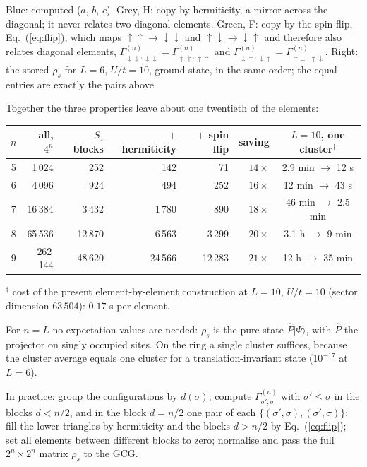 \documentclass[11pt]{article}
\newcommand{\rdm}{\Gamma^{(n)}}
\begin{document}
{\small Blue: computed ($a$, $b$, $c$). Grey, H: copy by hermiticity, a mirror across the diagonal;
it never relates two diagonal elements. Green, F: copy by the spin flip, Eq.~(\ref{eq:flip}), which maps
$\uparrow\uparrow\to\downarrow\downarrow$ and $\uparrow\downarrow\to\downarrow\uparrow$ and therefore also relates diagonal elements,
$\rdm_{\downarrow\downarrow,\downarrow\downarrow}=\rdm_{\uparrow\uparrow,\uparrow\uparrow}$ and
$\rdm_{\downarrow\uparrow,\downarrow\uparrow}=\rdm_{\uparrow\downarrow,\uparrow\downarrow}$. Right: the stored $\rho_s$ for
$L=6$, $U/t=10$, ground state, in the same order; the equal entries are exactly the pairs above.}

Together the three properties leave about one twentieth of the elements:

\begin{table}[H]
\centering
\begin{tabular}{c r r r r r c}
\toprule
$n$ & all, $4^n$ & $S_z$ blocks & $+$ hermiticity & $+$ spin flip & saving & $L=10$, one cluster$^{\dagger}$ \\
\midrule
5 & 1\,024   & 252     & 142     & 71      & $14\times$ & 2.9 min $\to$ 12 s \\
6 & 4\,096   & 924     & 494     & 252     & $16\times$ & 12 min $\to$ 43 s \\
7 & 16\,384  & 3\,432  & 1\,780  & 890     & $18\times$ & 46 min $\to$ 2.5 min \\
8 & 65\,536  & 12\,870 & 6\,563  & 3\,299  & $20\times$ & 3.1 h $\to$ 9 min \\
9 & 262\,144 & 48\,620 & 24\,566 & 12\,283 & $21\times$ & 12 h $\to$ 35 min \\
\bottomrule
\end{tabular}

\smallskip
{\small $^{\dagger}$ cost of the present element-by-element construction at $L=10$, $U/t=10$
(sector dimension $63\,504$): $0.17$ s per element.}
\end{table}

For $n=L$ no expectation values are needed: $\rho_s$ is the pure state $\hat P|\Psi\rangle$, with
$\hat P$ the projector on singly occupied sites. On the ring a single cluster suffices, because the
cluster average equals one cluster for a translation-invariant state ($10^{-17}$ at $L=6$).

In practice: group the configurations by $d(\sigma)$; compute $\rdm_{\sigma',\sigma}$ with
$\sigma'\le\sigma$ in the blocks $d<n/2$, and in the block $d=n/2$ one pair of each
$\{(\sigma',\sigma),(\bar\sigma',\bar\sigma)\}$; fill the lower triangles by hermiticity and the blocks
$d>n/2$ by Eq.~(\ref{eq:flip}); set all elements between different blocks to zero; normalise and pass the
full $2^n\times2^n$ matrix $\rho_s$ to the GCG.
\end{document}

